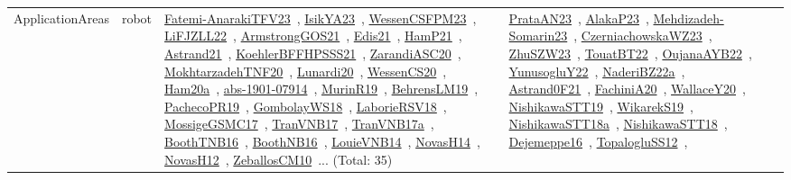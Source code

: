{\begin{longtable}{lp{3cm}>{\raggedright\arraybackslash}p{6cm}>{\raggedright\arraybackslash}p{6cm}>{\raggedright\arraybackslash}p{8cm}}
\index{robot}\index{ApplicationAreas!robot}ApplicationAreas & robot & \href{../works/Fatemi-AnarakiTFV23.pdf}{Fatemi-AnarakiTFV23}~\cite{Fatemi-AnarakiTFV23}, \href{../works/IsikYA23.pdf}{IsikYA23}~\cite{IsikYA23}, \href{../works/WessenCSFPM23.pdf}{WessenCSFPM23}~\cite{WessenCSFPM23}, \href{../works/LiFJZLL22.pdf}{LiFJZLL22}~\cite{LiFJZLL22}, \href{../works/ArmstrongGOS21.pdf}{ArmstrongGOS21}~\cite{ArmstrongGOS21}, \href{../works/Edis21.pdf}{Edis21}~\cite{Edis21}, \href{../works/HamP21.pdf}{HamP21}~\cite{HamP21}, \href{../works/Astrand21.pdf}{Astrand21}~\cite{Astrand21}, \href{../works/KoehlerBFFHPSSS21.pdf}{KoehlerBFFHPSSS21}~\cite{KoehlerBFFHPSSS21}, \href{../works/ZarandiASC20.pdf}{ZarandiASC20}~\cite{ZarandiASC20}, \href{../works/MokhtarzadehTNF20.pdf}{MokhtarzadehTNF20}~\cite{MokhtarzadehTNF20}, \href{../works/Lunardi20.pdf}{Lunardi20}~\cite{Lunardi20}, \href{../works/WessenCS20.pdf}{WessenCS20}~\cite{WessenCS20}, \href{../works/Ham20a.pdf}{Ham20a}~\cite{Ham20a}, \href{../works/abs-1901-07914.pdf}{abs-1901-07914}~\cite{abs-1901-07914}, \href{../works/MurinR19.pdf}{MurinR19}~\cite{MurinR19}, \href{../works/BehrensLM19.pdf}{BehrensLM19}~\cite{BehrensLM19}, \href{../works/PachecoPR19.pdf}{PachecoPR19}~\cite{PachecoPR19}, \href{../works/GombolayWS18.pdf}{GombolayWS18}~\cite{GombolayWS18}, \href{../works/LaborieRSV18.pdf}{LaborieRSV18}~\cite{LaborieRSV18}, \href{../works/MossigeGSMC17.pdf}{MossigeGSMC17}~\cite{MossigeGSMC17}, \href{../works/TranVNB17.pdf}{TranVNB17}~\cite{TranVNB17}, \href{../works/TranVNB17a.pdf}{TranVNB17a}~\cite{TranVNB17a}, \href{../works/BoothTNB16.pdf}{BoothTNB16}~\cite{BoothTNB16}, \href{../works/BoothNB16.pdf}{BoothNB16}~\cite{BoothNB16}, \href{../works/LouieVNB14.pdf}{LouieVNB14}~\cite{LouieVNB14}, \href{../works/NovasH14.pdf}{NovasH14}~\cite{NovasH14}, \href{../works/NovasH12.pdf}{NovasH12}~\cite{NovasH12}, \href{../works/ZeballosCM10.pdf}{ZeballosCM10}~\cite{ZeballosCM10}... (Total: 35) & \href{../works/PrataAN23.pdf}{PrataAN23}~\cite{PrataAN23}, \href{../works/AlakaP23.pdf}{AlakaP23}~\cite{AlakaP23}, \href{../works/Mehdizadeh-Somarin23.pdf}{Mehdizadeh-Somarin23}~\cite{Mehdizadeh-Somarin23}, \href{../works/CzerniachowskaWZ23.pdf}{CzerniachowskaWZ23}~\cite{CzerniachowskaWZ23}, \href{../works/ZhuSZW23.pdf}{ZhuSZW23}~\cite{ZhuSZW23}, \href{../works/TouatBT22.pdf}{TouatBT22}~\cite{TouatBT22}, \href{../works/OujanaAYB22.pdf}{OujanaAYB22}~\cite{OujanaAYB22}, \href{../works/YunusogluY22.pdf}{YunusogluY22}~\cite{YunusogluY22}, \href{../works/NaderiBZ22a.pdf}{NaderiBZ22a}~\cite{NaderiBZ22a}, \href{../works/Astrand0F21.pdf}{Astrand0F21}~\cite{Astrand0F21}, \href{../works/FachiniA20.pdf}{FachiniA20}~\cite{FachiniA20}, \href{../works/WallaceY20.pdf}{WallaceY20}~\cite{WallaceY20}, \href{../works/NishikawaSTT19.pdf}{NishikawaSTT19}~\cite{NishikawaSTT19}, \href{../works/WikarekS19.pdf}{WikarekS19}~\cite{WikarekS19}, \href{../works/NishikawaSTT18a.pdf}{NishikawaSTT18a}~\cite{NishikawaSTT18a}, \href{../works/NishikawaSTT18.pdf}{NishikawaSTT18}~\cite{NishikawaSTT18}, \href{../works/Dejemeppe16.pdf}{Dejemeppe16}~\cite{Dejemeppe16}, \href{../works/TopalogluSS12.pdf}{TopalogluSS12}~\cite{TopalogluSS12}, 
\end{longtable}}
